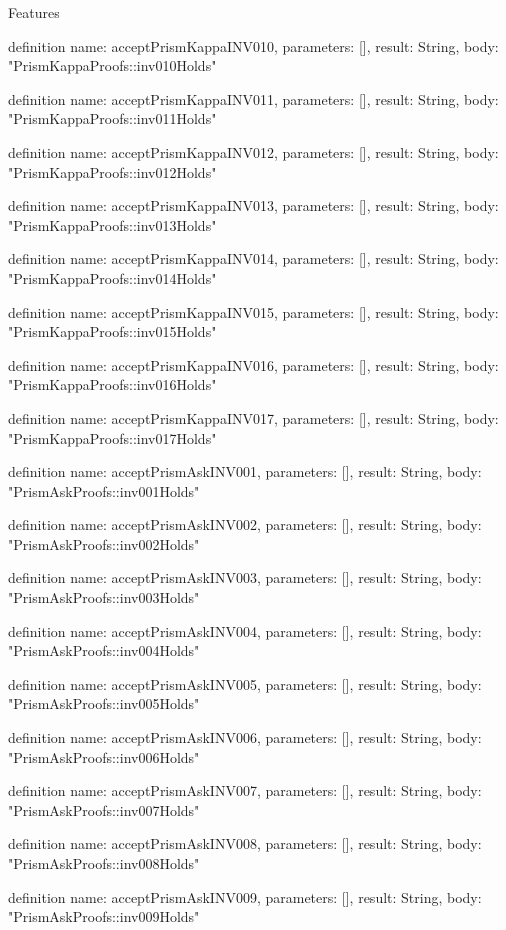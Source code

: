 \begin{lexlean}{Features}
\begin{semanticmodule}
definition{
  name: acceptPrismKappaINV010,
  parameters: [],
  result: String,
  body: "PrismKappaProofs::inv010Holds"
}

definition{
  name: acceptPrismKappaINV011,
  parameters: [],
  result: String,
  body: "PrismKappaProofs::inv011Holds"
}

definition{
  name: acceptPrismKappaINV012,
  parameters: [],
  result: String,
  body: "PrismKappaProofs::inv012Holds"
}

definition{
  name: acceptPrismKappaINV013,
  parameters: [],
  result: String,
  body: "PrismKappaProofs::inv013Holds"
}

definition{
  name: acceptPrismKappaINV014,
  parameters: [],
  result: String,
  body: "PrismKappaProofs::inv014Holds"
}

definition{
  name: acceptPrismKappaINV015,
  parameters: [],
  result: String,
  body: "PrismKappaProofs::inv015Holds"
}

definition{
  name: acceptPrismKappaINV016,
  parameters: [],
  result: String,
  body: "PrismKappaProofs::inv016Holds"
}

definition{
  name: acceptPrismKappaINV017,
  parameters: [],
  result: String,
  body: "PrismKappaProofs::inv017Holds"
}

definition{
  name: acceptPrismAskINV001,
  parameters: [],
  result: String,
  body: "PrismAskProofs::inv001Holds"
}

definition{
  name: acceptPrismAskINV002,
  parameters: [],
  result: String,
  body: "PrismAskProofs::inv002Holds"
}

definition{
  name: acceptPrismAskINV003,
  parameters: [],
  result: String,
  body: "PrismAskProofs::inv003Holds"
}

definition{
  name: acceptPrismAskINV004,
  parameters: [],
  result: String,
  body: "PrismAskProofs::inv004Holds"
}

definition{
  name: acceptPrismAskINV005,
  parameters: [],
  result: String,
  body: "PrismAskProofs::inv005Holds"
}

definition{
  name: acceptPrismAskINV006,
  parameters: [],
  result: String,
  body: "PrismAskProofs::inv006Holds"
}

definition{
  name: acceptPrismAskINV007,
  parameters: [],
  result: String,
  body: "PrismAskProofs::inv007Holds"
}

definition{
  name: acceptPrismAskINV008,
  parameters: [],
  result: String,
  body: "PrismAskProofs::inv008Holds"
}

definition{
  name: acceptPrismAskINV009,
  parameters: [],
  result: String,
  body: "PrismAskProofs::inv009Holds"
}


\end{semanticmodule}
\end{lexlean}
